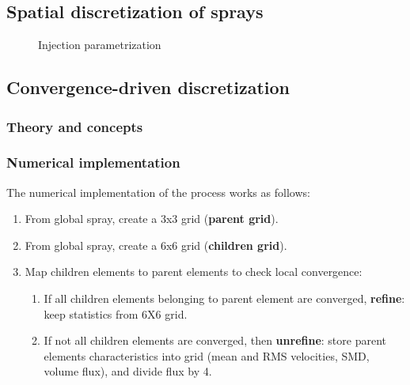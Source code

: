 \subsection{Spatial discretization of sprays}
\label{subsec:SLI_spatial_discretization}

\begin{figure}[h!]	
	\centering
	\caption{Injection parametrization}
	\label{fig:SLI_injection}
\end{figure}

\subsection{Convergence-driven discretization}
\label{subsec:SLI_quadtrees_discretization}

\subsubsection{Theory and concepts}

\subsubsection{Numerical implementation}

The numerical implementation of the process works as follows:

\begin{enumerate}

	\item From global spray, create a 3x3 grid (\textbf{parent grid}).
	
	\item From global spray, create a 6x6 grid (\textbf{children grid}).
	
	\item Map children elements to parent elements to check local convergence:
	
	\begin{enumerate}
	
		\item If all children elements belonging to parent element are converged, \textbf{refine}: keep statistics from 6X6 grid.
		
		\item If not all children elements are converged, then \textbf{unrefine}: store parent elements characteristics into grid (mean and RMS velocities, SMD, volume flux),  and divide flux by 4.
	
	\end{enumerate}

\end{enumerate}

